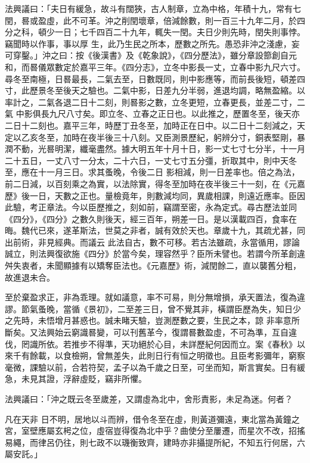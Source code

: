 \begin{pinyinscope}
 法興議曰：「夫日有緩急，故斗有闊狹，古人制章，立為中格，年積十九，常有七閏，晷或盈虛，此不可革。沖之削閏壞章，倍減餘數，則一百三十九年二月，於四分之科，頓少一日；七千四百二十九年，輒失一閏。夫日少則先時，閏失則事悖。竊聞時以作事，事以厚
 生，此乃生民之所本，歷數之所先。愚恐非沖之淺慮，妄可穿鑿。」沖之曰：按《後漢書》及《乾象說》，《四分歷法》，雖分章設篰創自元和，而晷儀眾數定於嘉平三年。《四分志》，立冬中影長一丈，立春中影九尺六寸。尋冬至南極，日晷最長，二氣去至，日數既同，則中影應等，而前長後短，頓差四寸，此歷景冬至後天之驗也。二氣中影，日差九分半弱，進退均調，略無盈縮。以率計之，二氣各退二日十二刻，則晷影之數，立冬更短，立春更長，並差二寸，二氣
 中影俱長九尺八寸矣。即立冬、立春之正日也。以此推之，歷置冬至，後天亦二日十二刻也。嘉平三年，時歷丁丑冬至，加時正在日中。以二日十二刻減之，天定以乙亥冬至，加時在夜半後三十八刻。又臣測景歷紀，躬辨分寸，銅表堅剛，暴潤不動，光晷明潔，纖毫盡然。據大明五年十月十日，影一丈七寸七分半，十一月二十五日，一丈八寸一分太，二十六日，一丈七寸五分彊，折取其中，則中天冬至，應在十一月三日。求其蚤晚，令後二日
 影相減，則一日差率也。倍之為法，前二日減，以百刻乘之為實，以法除實，得冬至加時在夜半後三十一刻，在《元嘉歷》後一日，天數之正也。量檢竟年，則數減均同，異歲相課，則遠近應率。臣因此驗，考正章法。今以臣歷推之，刻如前，竊謂至密，永為定式。尋古歷法並同《四分》，《四分》之數久則後天，經三百年，朔差一日。是以漢載四百，食率在晦。魏代已來，遂革斯法，世莫之非者，誠有效於天也。章歲十九，其疏尤甚，同出前術，非見經典。而議云
 此法自古，數不可移。若古法雖疏，永當循用，謬論誠立，則法興復欲施《四分》於當今矣，理容然乎？臣所未譬也。若謂今所革創違舛失衷者，未聞顯據有以矯奪臣法也。《元嘉歷》術，減閏餘二，直以襲舊分粗，故進退未合。



 至於棄盈求正，非為乖理。就如議意，率不可易，則分無增損，承天置法，復為違謬。節氣蚤晚，當循《景初》，二至差三日，曾不覺其非，橫謂臣歷為失，知日少之先時，未悟增月甚惑也。誠未睹天驗，豈測歷數之要，生民之本，諒
 非率意所斷矣。又法興始云窮識晷變，可以刊舊革今，復謂晷數盈虛，不可為準，互自違伐，罔識所依。若推步不得準，天功絕於心目，未詳歷紀何因而立。案《春秋》以來千有餘載，以食檢朔，曾無差失，此則日行有恒之明徵也。且臣考影彌年，窮察毫微，課驗以前，合若符契，孟子以為千歲之日至，可坐而知，斯言實矣。日有緩急，未見其證，浮辭虛貶，竊非所懼。



 法興議曰：「沖之既云冬至歲差，又謂虛為北中，舍形責影，未足為迷。何者？



 凡在天非
 日不明，居地以斗而辨，借令冬至在虛，則黃道彌遠，東北當為黃鐘之宮，室壁應屬玄枵之位，虛宿豈得復為北中乎？曲使分至屢遷，而星次不改，招搖易繩，而律呂仍往，則七政不以璣衡致齊，建時亦非攝提所紀，不知五行何居，六屬安託。」




\end{pinyinscope}
